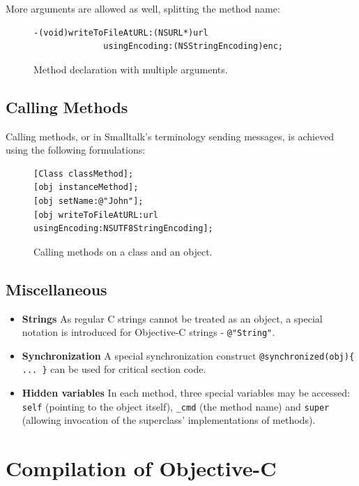 More arguments are allowed as well, splitting the method name:

\begin{figure}[H]
  \begin{verbatim}
-(void)writeToFileAtURL:(NSURL*)url 
              usingEncoding:(NSStringEncoding)enc;
  \end{verbatim}
  \centering{}
  \caption{Method declaration with multiple arguments.}
  \label{fig:syntax_objc_multiple_args}
\end{figure}

\subsection{Calling Methods}

Calling methods, or in Smalltalk's terminology sending messages, is achieved using the following formulations:

\begin{figure}[H]
  \begin{verbatim}
[Class classMethod];
[obj instanceMethod];
[obj setName:@"John"];
[obj writeToFileAtURL:url usingEncoding:NSUTF8StringEncoding];
  \end{verbatim}
  \centering{}
  \caption{Calling methods on a class and an object.}
  \label{fig:syntax_objc_msg_sending}
\end{figure}

\subsection{Miscellaneous}

\begin{itemize}
  \item{\bf{Strings}} As regular C strings cannot be treated as an object, a special notation is introduced for Objective-C strings - \verb=@"String"=.
  \item{\bf{Synchronization}} A special synchronization construct \newline{}\verb=@synchronized(obj){ ... }= can be used for critical section code.
  \item{\bf{Hidden variables}} In each method, three special variables may be accessed: \verb=self= (pointing to the object itself), \verb=_cmd= (the method name) and \verb=super= (allowing invocation of the superclass' implementations of methods).
\end{itemize}


\section{Compilation of Objective-C}

